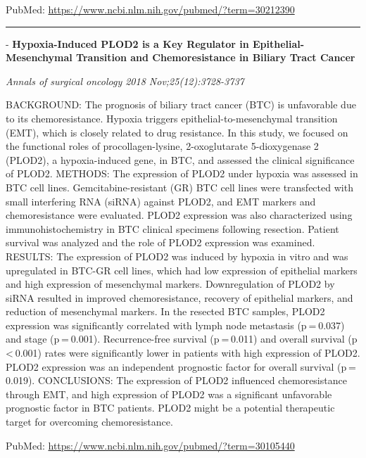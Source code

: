 \documentclass[]{article}
\begin{document}
PubMed: \url{https://www.ncbi.nlm.nih.gov/pubmed/?term=30212390}

{}

{}

\begin{center}\rule{0.5\linewidth}{\linethickness}\end{center}

 - \textbf{Hypoxia-Induced PLOD2 is a Key Regulator in
Epithelial-Mesenchymal Transition and Chemoresistance in Biliary Tract
Cancer}

\emph{Annals of surgical oncology 2018 Nov;25(12):3728-3737}

BACKGROUND: The prognosis of biliary tract cancer (BTC) is unfavorable
due to its chemoresistance. Hypoxia triggers epithelial-to-mesenchymal
transition (EMT), which is closely related to drug resistance. In this
study, we focused on the functional roles of procollagen-lysine,
2-oxoglutarate 5-dioxygenase 2 (PLOD2), a hypoxia-induced gene, in BTC,
and assessed the clinical significance of PLOD2. METHODS: The expression
of PLOD2 under hypoxia was assessed in BTC cell lines.
Gemcitabine-resistant (GR) BTC cell lines were transfected with small
interfering RNA (siRNA) against PLOD2, and EMT markers and
chemoresistance were evaluated. PLOD2 expression was also characterized
using immunohistochemistry in BTC clinical specimens following
resection. Patient survival was analyzed and the role of PLOD2
expression was examined. RESULTS: The expression of PLOD2 was induced by
hypoxia in vitro and was upregulated in BTC-GR cell lines, which had low
expression of epithelial markers and high expression of mesenchymal
markers. Downregulation of PLOD2 by siRNA resulted in improved
chemoresistance, recovery of epithelial markers, and reduction of
mesenchymal markers. In the resected BTC samples, PLOD2 expression was
significantly correlated with lymph node metastasis (p = 0.037) and
stage (p = 0.001). Recurrence-free survival (p = 0.011) and overall
survival (p \textless{} 0.001) rates were significantly lower in
patients with high expression of PLOD2. PLOD2 expression was an
independent prognostic factor for overall survival (p = 0.019).
CONCLUSIONS: The expression of PLOD2 influenced chemoresistance through
EMT, and high expression of PLOD2 was a significant unfavorable
prognostic factor in BTC patients. PLOD2 might be a potential
therapeutic target for overcoming chemoresistance.

PubMed: \url{https://www.ncbi.nlm.nih.gov/pubmed/?term=30105440}

{}
\end{document}
